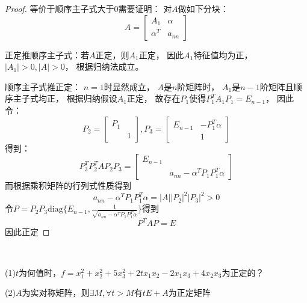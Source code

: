 \begin{proof}
  等价于顺序主子式大于$0$需要证明：
  对$A$做如下分块：
  \begin{equation*}
    A = \left[
      \begin{array}{cc}
        A_1&\alpha\\
        \alpha^T& a_{nn}
      \end{array}
    \right]
  \end{equation*}

  正定推顺序主子式：若$A$正定，则$A_1$正定，
  因此$A_1$特征值均为正，$|A_1| > 0, |A| > 0$，
  根据归纳法成立。

  顺序主子式推正定：
  $n = 1$时显然成立，
  $A$是$n$阶矩阵时，
  $A_1$是$n-1$阶矩阵且顺序主子式均正，
  根据归纳假设$A_1$正定，
  故存在$P_1$使得$P_1^TA_1P_1 = E_{n-1}$，
  因此令：
  \begin{equation*}
    P_2 = \left[
      \begin{array}{cc}
        P_1&\\
        &1
      \end{array}
    \right],
    P_3 = \left[
      \begin{array}{cc}
        E_{n-1}&-P_1^T\alpha \\
               &1
      \end{array}
    \right]
  \end{equation*}
  得到：
  \begin{equation*}
    P_3^TP_2^TAP_2P_3 = \left[
      \begin{array}{cc}
        E_{n-1}& \\
               &a_{nn} - \alpha^TP_1P_1^T\alpha
      \end{array}
    \right]
  \end{equation*}
  而根据乘积矩阵的行列式性质得到
  \begin{equation*}
    a_{nn} - \alpha^TP_1P_1^T \alpha  = |A||P_2|^2 |P_3|^2 > 0
  \end{equation*}
  令$P = P_2P_3 \mathrm{diag}\{E_{n-1}, \frac{1}{\sqrt{a_{nn} - \alpha^TP_1P_1^T\alpha}}\}$得到
  \begin{equation*}
    P^TAP = E
  \end{equation*}
  因此正定
\end{proof}

~

\begin{exercise}[正定二次型的判定]
  (1)$t$为何值时，$f = x_1^2 + x_2^2 + 5x_3^2 + 2tx_1x_2 - 2x_1x_3 + 4x_2x_3$为正定的？

  (2)$A$为实对称矩阵，则$\exists M, \forall t > M$有$tE + A$为正定矩阵
\end{exercise}

